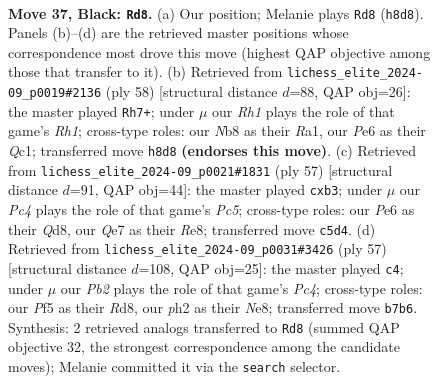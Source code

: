 \documentclass[11pt]{article}
\begin{document}
\clearpage

\begin{figure}[p]\centering
\begin{subfigure}{0.46\textwidth}\centering
\resizebox{\linewidth}{!}{%
\newchessgame
\chessboard[
  setfen={rnb4r/1p2q1k1/4p3/p1p2p1p/PnNP1P2/5NP1/1P1QB1KP/3R3R b - - 2 37},
  showmover=false,
  pgfstyle=straightmove, color=movearrow, markmove={h8-d8}
]}
\caption{}
\end{subfigure}\hfill
\begin{subfigure}{0.46\textwidth}\centering
\resizebox{\linewidth}{!}{%
\newchessgame
\chessboard[
  setfen={2r2r2/1b1n1pk1/np1q4/p1pPp1N1/P1P1P1P1/3B4/1P2KP2/R1Q4R w - - 0 30},
  showmover=false,
  pgfstyle=straightmove, color=movearrow, markmove={h1-h7}
]}
\caption{}
\end{subfigure}
\\[4pt]
\begin{subfigure}{0.46\textwidth}\centering
\resizebox{\linewidth}{!}{%
\newchessgame
\chessboard[
  setfen={3qr1k1/r1p2pb1/3p2np/6p1/P1p1P1Q1/1P2N3/2PB1PPP/4RRK1 b - - 1 29},
  showmover=false,
  pgfstyle=straightmove, color=movearrow, markmove={c4-b3}
]}
\caption{}
\end{subfigure}\hfill
\begin{subfigure}{0.46\textwidth}\centering
\resizebox{\linewidth}{!}{%
\newchessgame
\chessboard[
  setfen={3rn1k1/3nbp2/p3q1pB/Ppp1p3/4P2P/5NP1/P2Q1PK1/3RR3 b - - 0 29},
  showmover=false,
  pgfstyle=straightmove, color=movearrow, markmove={c5-c4}
]}
\caption{}
\end{subfigure}
\caption{\textbf{Move 37, Black: \texttt{Rd8}.} (a) Our position; Melanie plays \texttt{Rd8} (\texttt{h8d8}). Panels (b)--(d) are the retrieved master positions whose correspondence most drove this move (highest QAP objective among those that transfer to it). (b) Retrieved from \texttt{lichess\_elite\_2024-09\_p0019\#2136} (ply 58) [structural distance $d$=88, QAP obj=26]: the master played \texttt{Rh7+}; under $\mu$ our \emph{Rh1} plays the role of that game's \emph{Rh1}; cross-type roles: our \emph{N}b8 as their \emph{R}a1, our \emph{P}e6 as their \emph{Q}c1; transferred move \texttt{h8d8} \textbf{(endorses this move)}. (c) Retrieved from \texttt{lichess\_elite\_2024-09\_p0021\#1831} (ply 57) [structural distance $d$=91, QAP obj=44]: the master played \texttt{cxb3}; under $\mu$ our \emph{Pc4} plays the role of that game's \emph{Pc5}; cross-type roles: our \emph{P}e6 as their \emph{Q}d8, our \emph{Q}e7 as their \emph{R}e8; transferred move \texttt{c5d4}. (d) Retrieved from \texttt{lichess\_elite\_2024-09\_p0031\#3426} (ply 57) [structural distance $d$=108, QAP obj=25]: the master played \texttt{c4}; under $\mu$ our \emph{Pb2} plays the role of that game's \emph{Pc4}; cross-type roles: our \emph{P}f5 as their \emph{R}d8, our \emph{p}h2 as their \emph{N}e8; transferred move \texttt{b7b6}. Synthesis: 2 retrieved analogs transferred to \texttt{Rd8} (summed QAP objective 32, the strongest correspondence among the candidate moves); Melanie committed it via the \texttt{search} selector.}
\label{fig:thought-m73}
\end{figure}
\end{document}
